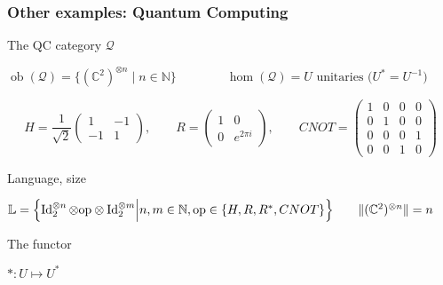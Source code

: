 \documentclass[10pt]{beamer}
\newcommand{\cat}[1]{\mathscr{#1}}
\renewcommand{\L}{\cat{L}}
\newcommand{\size}[1]{\lVert#1\rVert}
\DeclareMathOperator{\ob}{ob}
\DeclareMathOperator{\Id}{Id}
\newcommand{\N}{\mathbb{N}}
\newcommand{\Complex}{\mathbb{C}}
\renewcommand{\L}{\mathbb{L}}
\begin{document}
\begin{frame}
  \frametitle{Other examples: Quantum Computing}

  \begin{block}{The QC category $\cat{Q}$}
    \begin{center}
    $\ob(\cat{Q}) = \{\left(\Complex^2\right)^{\otimes n}\;|\;n\in\N\}
    \qquad\qquad \hom(\cat{Q}) = U \text{ unitaries
      ($U^\ast=U^{-1}$)}$
    \end{center}
  \end{block}

  \begin{equation*}
    H = \frac{1}{\sqrt{2}}\begin{pmatrix}
      1 & -1 \\ -1 & 1
    \end{pmatrix},
    \qquad
    R = \begin{pmatrix}
      1 & 0 \\ 0 & e^{2\pi i }
    \end{pmatrix},
    \qquad
    CNOT = \begin{pmatrix}
      1 & 0 & 0 & 0\\
      0 & 1 & 0 & 0\\
      0 & 0 & 0 & 1\\
      0 & 0 & 1 & 0
    \end{pmatrix}
  \end{equation*}

  \begin{block}{Language, size}
    \begin{center}
      $\L = \Bigl\{\Id_2^{\otimes
        n}\otimes\mathrm{op}\otimes\Id_2^{\otimes m}\Bigl\lvert
      n,m\in\N, \mathrm{op}\in\{H,R,R^\ast,CNOT\} \Bigr\} \qquad
      \size{(\Complex^2)^{\otimes n}} = n$
    \end{center}
  \end{block}
  
  \begin{block}{The functor}
    \begin{center}
      $\ast : U\mapsto U^\ast$
    \end{center}
  \end{block}
\end{frame}
\end{document}
